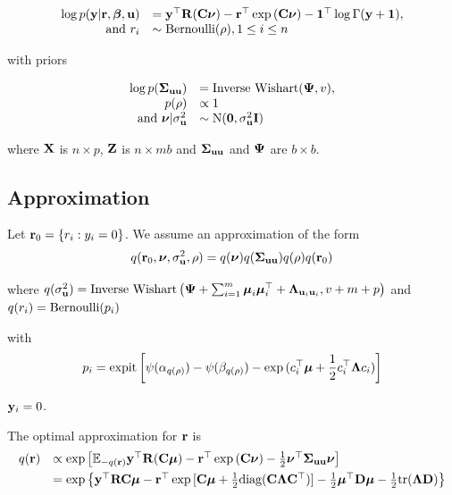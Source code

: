 \documentclass{article}[12pt]
\begin{document}
$$
\begin{array}{rl}
\log{p({\bf y}|{\bf r}, {\boldsymbol\beta}, {\bf u})} &= {\bf y}^\top {\bf R} ({\bf C}{\boldsymbol \nu}) - {\bf r}^\top \exp{({\bf C}{\boldsymbol\nu})} - {\bf 1}^\top \log{\Gamma{({\bf y}+ {\bf1})}}, \\
\mbox{ and }
r_i &\sim \text{Bernoulli}(\rho), 1 \leq i \leq n \\
\end{array}
$$

with priors

$$ 
\begin{array}{rl}
\log{p({\boldsymbol\Sigma}_{{\bf u}{\bf u}})} &= \text{Inverse Wishart}({\boldsymbol \Psi}, v),\\
p(\rho) &\propto 1 \\
\mbox{ and } {\boldsymbol\nu}|\sigma_{\bf u}^2 &\sim \mbox{N}({\bf 0}, \sigma_{\bf u}^2 {\bf I})\\
\end{array}
$$

where ${\bf X}$ is $n \times p$, ${\bf Z}$ is $n \times mb$ and ${\boldsymbol \Sigma}_{{\bf u} {\bf u}}$ and ${\boldsymbol \Psi}$ are $b \times b$.

\subsection{Approximation}
Let ${\bf r}_0 = \{ r_i : y_i = 0 \}$.
We assume an approximation of the form
$$
q({\bf r}_0, {\boldsymbol \nu}, \sigma_{{\bf u}}^2, \rho) = q({\boldsymbol \nu}) q({\boldsymbol \Sigma}_{{\bf u} {\bf u}}) q(\rho) q({\bf r}_0) \\
$$

where 
$q(\sigma_{{\bf u}}^2) = \mbox{Inverse Wishart}\left({\boldsymbol \Psi} + \sum_{i=1}^m {\boldsymbol \mu}_i {\boldsymbol \mu}_i^\top + {\boldsymbol \Lambda}_{{\bf u}_i {\bf u}_i}, v + m + 
p\right)$ \mbox{and } $q(r_i) = \text{Bernoulli} (p_i)$

with
$$
p_i = \text{expit} \left[ \psi{(\alpha_{q(\rho)})} - \psi{(\beta_{q(\rho)})} - \exp{(c_i^\top{\boldsymbol\mu}+ {\frac{1}{2}}c_i^\top {\boldsymbol\Lambda}c_i)} \right]
$$

 ${\bf y}_i = 0$.


The optimal approximation for ${\bf r}$ is
$$
\begin{array}{rl}
q({\bf r}) &\propto \exp \left [ {\mathbb E}_{-q({\bf r})}{\bf y}^\top{\bf R}({\bf C}{\boldsymbol \mu}) - {\bf r}^\top\exp{({\bf C}{\boldsymbol\nu})}-{\frac{1}{2}} {\boldsymbol \nu}^\top {\boldsymbol\Sigma}_{{\bf u} {\bf u}} {\boldsymbol \nu} \right ] \\ [1ex]
	&= \exp{ \left\{ {\bf y}^\top{\bf R}{\bf C}{\boldsymbol\mu}- {\bf r}^\top \exp{[{\bf C}{\boldsymbol\mu}+ {\frac{1}{2}}\text{diag}({\bf C}{\boldsymbol\Lambda}{\bf C}^\top)]} - {\frac{1}{2}}{\boldsymbol\mu}^\top {\bf D}{\boldsymbol\mu}- {\frac{1}{2}}\text{tr}({\boldsymbol\Lambda}{\bf D}) \right\} }
\end{array}
$$
\end{document}
